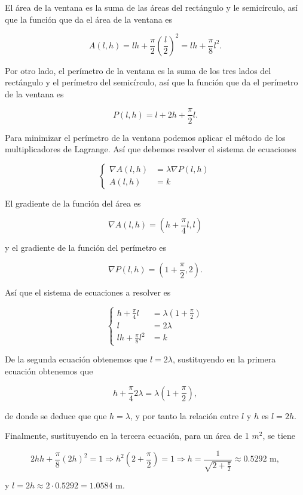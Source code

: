 \documentclass[
  spanish,
  a4paper,
]{scrreport}
\theoremstyle{definition}
\theoremstyle{remark}
\begin{document}
\begin{tcolorbox}[enhanced jigsaw, arc=.35mm, bottomrule=.15mm, bottomtitle=1mm, breakable, colback=white, colbacktitle=quarto-callout-tip-color!10!white, colframe=quarto-callout-tip-color-frame, coltitle=black, left=2mm, leftrule=.75mm, opacityback=0, opacitybacktitle=0.6, rightrule=.15mm, title=\textcolor{quarto-callout-tip-color}{\faLightbulb}\hspace{0.5em}{Solución}, titlerule=0mm, toprule=.15mm, toptitle=1mm]

El área de la ventana es la suma de las áreas del rectángulo y le
semicírculo, así que la función que da el área de la ventana es

\[
A(l,h)=lh+\frac{\pi}{2}\left(\frac{l}{2}\right)^2 = lh + \frac{\pi}{8}l^2.
\]

Por otro lado, el perímetro de la ventana es la suma de los tres lados
del rectángulo y el perímetro del semicírculo, así que la función que da
el perímetro de la ventana es

\[
P(l,h)=l+2h+\frac{\pi}{2}l.
\]

Para minimizar el perímetro de la ventana podemos aplicar el método de
los multiplicadores de Lagrange. Así que debemos resolver el sistema de
ecuaciones

\[
\begin{cases}
\nabla A(l,h) &= \lambda \nabla P(l,h) \\
A(l,h) &= k
\end{cases}
\]

El gradiente de la función del área es

\[
\nabla A(l,h) = \left( h + \frac{\pi}{4}l,  l\right)
\]

y el gradiente de la función del perímetro es

\[
\nabla P(l,h) = \left( 1 + \frac{\pi}{2}, 2\right).
\]

Así que el sistema de ecuaciones a resolver es

\[
\begin{cases}
h + \frac{\pi}{4}l &= \lambda \left( 1 + \frac{\pi}{2}\right) \\
l &= 2\lambda \\
lh + \frac{\pi}{8}l^2 &= k
\end{cases}
\]

De la segunda ecuación obtenemos que \(l=2\lambda\), sustituyendo en la
primera ecuación obtenemos que

\[
h + \frac{\pi}{4}2\lambda = \lambda \left( 1 + \frac{\pi}{2}\right),
\]

de donde se deduce que que \(h = \lambda\), y por tanto la relación
entre \(l\) y \(h\) es \(l=2h\).

Finalmente, sustituyendo en la tercera ecuación, para un área de 1
\(m^2\), se tiene

\[
2hh + \frac{\pi}{8}(2h)^2 = 1 
\Rightarrow h^2\left( 2 + \frac{\pi}{2}\right) = 1 
\Rightarrow h = \frac{1}{\sqrt{2 + \frac{\pi}{2}}}
\approx 0.5292 \mbox{ m},
\]

y \(l = 2h \approx 2\cdot 0.5292 = 1.0584\) m.

\end{tcolorbox}
\end{document}
